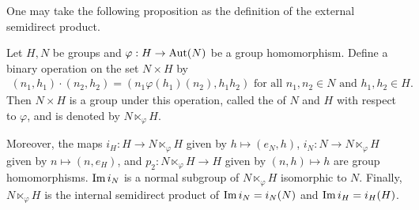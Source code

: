 One may take the following proposition as the definition of the external semidirect product.

\begin{proposition}
    Let $H,N$ be groups and $\varphi:H \to \operatorname{Aut}(N)$ be a group homomorphism. Define a binary operation on the set $N \times H$ by
    \begin{align}
        (n_{1},h_{1}) \cdot (n_{2},h_{2}) = (n_{1}\varphi(h_{1})(n_{2}),h_{1}h_{2}) \text{ for all } n_{1},n_{2} \in N \text{ and } h_{1},h_{2} \in H.
    \end{align}
    Then $N \times H$ is a group under this operation, called the  of $N$ and $H$ with respect to $\varphi$, and is denoted by $N \ltimes_{\varphi} H$.

    Moreover, the maps $i_{H}:H \to N \ltimes_{\varphi} H$ given by $h \mapsto (e_{N},h)$, $i_{N}:N \to N \ltimes_{\varphi} H$ given by $n \mapsto (n,e_{H})$, and $p_{2}:N \ltimes_{\varphi} H \to H$ given by $(n,h) \mapsto h$ are group homomorphisms. $\operatorname{Im} i_{N}$ is a normal subgroup of $N \ltimes_{\varphi} H$ isomorphic to $N$. Finally, $N \ltimes_{\varphi} H$ is the internal semidirect product of $\operatorname{Im} i_{N} = i_{N}(N)$ and $\operatorname{Im} i_{H} = i_{H}(H)$.
\end{proposition}
